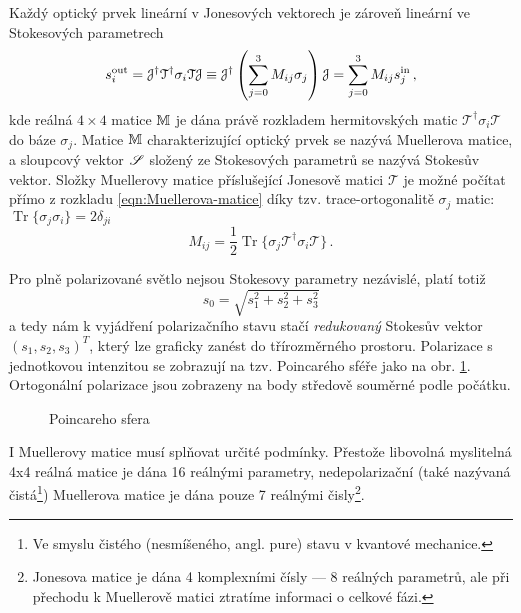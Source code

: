 Každý optický prvek lineární v Jonesových vektorech je zároveň lineární ve Stokesových parametrech
\begin{equation} 
\label{eqn:Muellerova-matice}
    s^\textrm{out}_i=\mathcal{J}^\dagger \mathcal{T}^\dagger \sigma_i \mathcal{T} \mathcal{J}\equiv\mathcal{J}^\dagger \left(\sum_{j=0}^{3} M_{ij} \sigma_j \right) \mathcal{J}
    =\sum_{j=0}^{3} M_{ij} s^\textrm{in}_j \,,
\end{equation}
kde reálná $4\times 4$ matice $\mathbb{M}$ je dána právě rozkladem hermitovských matic $\mathcal{T}^\dagger \sigma_i \mathcal{T}$ do báze $\sigma_j$.
Matice $\mathbb{M}$ charakterizující optický prvek se nazývá Muellerova matice, a sloupcový vektor $\mathscr{S}$ složený ze Stokesových parametrů se nazývá Stokesův vektor.
Složky Muellerovy matice příslušející Jonesově matici $\mathcal{T}$ je možné počítat přímo z rozkladu \eqref{eqn:Muellerova-matice} díky tzv. trace-ortogonalitě $\sigma_j$ matic: $\operatorname{Tr}\lbrace\sigma_j\sigma_i\rbrace=2\delta_{ji}$
\begin{equation} 
\label{e:mueller rozklad}
    M_{ij}=\frac{1}{2}\operatorname{Tr}\lbrace \sigma_j \mathcal{T}^\dagger \sigma_i \mathcal{T} \rbrace \,.
\end{equation}

Pro plně polarizované světlo nejsou Stokesovy parametry nezávislé, platí totiž
\begin{equation} 
\label{e:norma S}
    s_0=\sqrt{s_1^2+s_2^2+s_3^2}
\end{equation}
a tedy nám k vyjádření polarizačního stavu stačí \emph{redukovaný} Stokesův vektor $(s_1, s_2, s_3)^T$, který lze graficky zanést do třírozměrného prostoru.
Polarizace s jednotkovou intenzitou se zobrazují na tzv. Poincarého sféře jako na obr. \ref{fig:Poincareho-sfera}.
Ortogonální polarizace jsou zobrazeny na body středově souměrné podle počátku.

\begin{figure}[htbp]
    \centering
    \caption{Poincareho sfera}
    \label{fig:Poincareho-sfera}
\end{figure}

I Muellerovy matice musí splňovat určité podmínky.
Přestože libovolná myslitelná 4x4 reálná matice je dána 16 reálnými parametry, nedepolarizační (také nazývaná čistá\footnote{Ve smyslu čistého (nesmíšeného, angl. pure) stavu v kvantové mechanice.}) Muellerova matice je dána pouze 7 reálnými čisly\footnote{Jonesova matice je dána 4 komplexními čísly --- 8 reálných parametrů, ale při přechodu k Muellerově matici ztratíme informaci o celkové fázi.}. 

